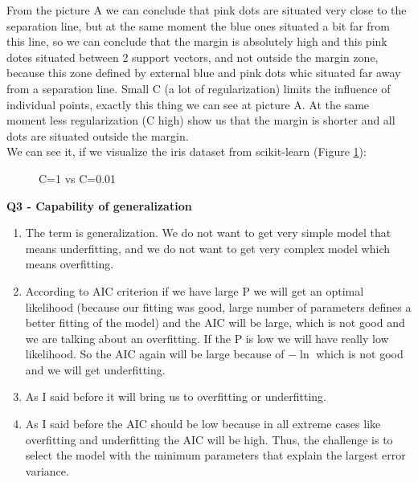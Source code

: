 \documentclass[12pt,a4paper]{article}
\begin{document}
From the picture A we can conclude that pink dots are situated very close to the separation line, but at the same moment the blue ones situated a bit far from this line, so we can conclude that the margin is absolutely high and this pink dotes situated between 2 support vectors, and not outside the margin zone, because this zone defined by external blue and pink dots whic situated far away from a separation line. Small C (a lot of regularization) limits the influence of individual points, exactly this thing we can see at picture A. At the same moment less regularization (C high) show us that the margin is shorter and all dots are situated outside the margin.\\
We can see it, if we visualize the iris dataset from scikit-learn (Figure \ref{ris:K2}):
\begin{figure}[h]
	\caption{C=1 vs C=0.01}
	\label{ris:K2}
\end{figure}
\newpage
\begin{center}
	\textbf{Q3 - Capability of generalization}
\end{center}
\begin{enumerate}[label=(\alph*)]
\item The term is generalization. We do not want to get very simple model that means underfitting, and we do not want to get very complex model which means overfitting. 
\item According to AIC criterion if we have large P we will get an optimal likelihood (because our fitting was good, large number of parameters defines a better fitting of the model) and the AIC will be large, which is not good and we are talking about an overfitting. If the P is low we will have really low likelihood. So the AIC again will be large because of $-\ln$ which is not good and we will get underfitting.
\item As I said before it will bring us to overfitting or underfitting.
\item As I said before the AIC should be low because in all extreme cases like overfitting and underfitting the AIC will be high. Thus, the challenge is to select the model with the minimum parameters that explain the largest error variance\cite{AIC}.

\end{enumerate}
\newpage


\end{document}
